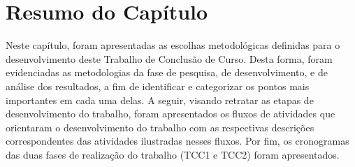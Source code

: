 \begin{table}[H]
    \centering
    \caption{Cronograma de Atividades do TCC2}
    \label{tab:cronograma_tcc2}
\end{table}

\section{Resumo do Capítulo}
\label{sec:resumo_metodologia}
Neste capítulo, foram apresentadas as escolhas metodológicas definidas para o desenvolvimento deste Trabalho de Conclusão de Curso. Desta forma, foram evidenciadas as metodologias da fase de pesquisa, de desenvolvimento, e de análise dos resultados, a fim de identificar e categorizar os pontos mais importantes em cada uma delas. A seguir, visando retratar as etapas de desenvolvimento do trabalho, foram apresentados os fluxos de atividades que orientaram o desenvolvimento do trabalho com as respectivas descrições correspondentes das atividades ilustradas nesses fluxos. Por fim, os cronogramas das duas fases de realização do trabalho (TCC1 e TCC2) foram apresentados.